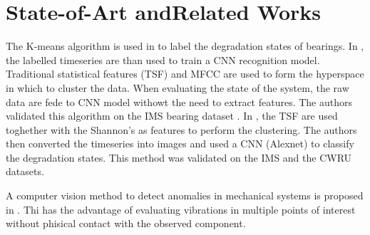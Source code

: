\section{State-of-Art andRelated Works}
\label{sec:related_work}


The K-means algorithm is used in \cite{Zhou2019,Pinedo2020} to label the degradation states of bearings.  In \cite{Zhou2019}, the labelled timeseries are than used to train a CNN recognition model. Traditional statistical features (TSF) and MFCC are used to form the hyperspace in which to cluster the data. When evaluating the state of the system, the raw data are fede to CNN model withowt the need to extract features. The authors validated this algorithm on the IMS bearing dataset \cite{IMS_data}. In \cite{Pinedo2020}, the TSF are used toghether with the Shannon's as features to perform the clustering. The authors then converted the timeseries into images and used a CNN (Alexnet) to classify the degradation states. This method was validated on the IMS and the CWRU datasets.





A  computer vision method to detect anomalies in mechanical systems is proposed in \cite{SPYTEK2023109823}. Thi has the advantage of evaluating vibrations in multiple points of interest without phisical contact with the observed component.


